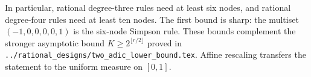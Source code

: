 \documentclass[11pt]{article}
\begin{document}
In particular, rational degree-three rules need at least six nodes,
and rational degree-four rules need at least ten nodes. The first bound
is sharp: the multiset $(-1,0,0,0,0,1)$ is the six-node Simpson rule.
These bounds complement the stronger asymptotic bound
$K\ge2^{\lfloor r/2\rfloor}$ proved in
\texttt{../rational\_designs/two\_adic\_lower\_bound.tex}.
Affine rescaling transfers the statement to the uniform measure on
$[0,1]$.
\end{document}
